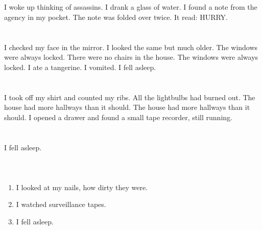 \documentclass{article}
\begin{document}
    \section{}
    I woke up thinking of assassins. I drank a glass of water. I found a note from the agency in my pocket. The note was folded over twice. It read: HURRY.  
    \newpage
    
    \section{}
    I checked my face in the mirror. I looked the same but much older. The windows were always locked. There were no chairs in the house. The windows were always locked. I ate a tangerine. I vomited. I fell asleep.  
    \newpage
    
    \section{}
    I took off my shirt and counted my ribs. All the lightbulbs had burned out. The house had more hallways than it should. The house had more hallways than it should. I opened a drawer and found a small tape recorder, still running.  
    \newpage
    
    \section{}
    I fell asleep.\\\\ 
    \newpage
    
    \section{}
    
    \begin{enumerate}
    
    \item I looked at my nails, how dirty they were.\\
    
    \item I watched surveillance tapes.\\
    
    \item I fell asleep.\\
    
    \end{enumerate}
     
    \newpage
    
\end{document}
